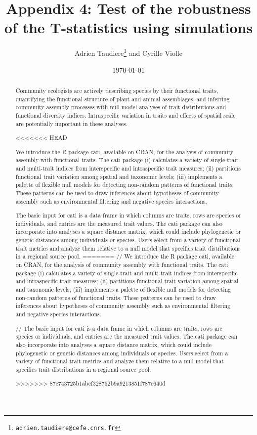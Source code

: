 \documentclass[12pt]{article}\usepackage[]{graphicx}\usepackage[]{color}
\title{Appendix 4: Test of the robustness of the T-statistics using simulations}
\author{Adrien Taudiere\thanks{\texttt{adrien.taudiere@cefe.cnrs.fr}} and Cyrille Violle}
\affil{{\footnotesize CEFE - Centre d'Ecologie Fonctionnelle et Evolutive, Montpellier: France}}
\date{\today}
\begin{document}




\maketitle

\begin{abstract}
  Community ecologists are actively describing species by their functional traits, quantifying the functional structure of plant and animal assemblages, and inferring community assembly processes with null model analyses of trait distributions and functional diversity indices. Intraspecific variation in traits and effects of spatial scale are potentially important in these analyses.
  
<<<<<<< HEAD

	We introduce the R package cati, available on CRAN, for the analysis of community assembly with functional traits. The cati package (i) calculates a variety of single-trait and multi-trait indices from interspecific and intraspecific trait measures; (ii) partitions functional trait variation among spatial and taxonomic levels; (iii) implements a palette of flexible null models for detecting non-random patterns of functional traits. These patterns can be used to draw inferences about hypotheses of community assembly such as environmental filtering and negative species interactions.
  

The basic input for cati is a data frame in which columns are traits, rows are species or individuals, and entries are the measured trait values. The cati package can also incorporate into analyses a square distance matrix, which could include phylogenetic or genetic distances among individuals or species. Users select from a variety of functional trait metrics and analyze them relative to a null model that specifies trait distributions in a regional source pool.
=======
//
	We introduce the R package cati, available on CRAN, for the analysis of community assembly with functional traits. The cati package (i) calculates a variety of single-trait and multi-trait indices from interspecific and intraspecific trait measures; (ii) partitions functional trait variation among spatial and taxonomic levels; (iii) implements a palette of flexible null models for detecting non-random patterns of functional traits. These patterns can be used to draw inferences about hypotheses of community assembly such as environmental filtering and negative species interactions.
  
//
The basic input for cati is a data frame in which columns are traits, rows are species or individuals, and entries are the measured trait values. The cati package can also incorporate into analyses a square distance matrix, which could include phylogenetic or genetic distances among individuals or species. Users select from a variety of functional trait metrics and analyze them relative to a null model that specifies trait distributions in a regional source pool.

>>>>>>> 87c743725b1abcf328762b9a9213851f787c640d
\end{abstract}
\end{document}

